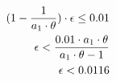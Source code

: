 \begin{equation}
  \begin{split}
    (1-\frac{1}{a_1 \cdot \theta}) \cdot \epsilon \leq 0.01 \\
    \epsilon < \frac{0.01 \cdot a_1 \cdot \theta}{a_1 \cdot \theta - 1} \\
    \epsilon < 0.0116
  \end{split}
\end{equation}





        


